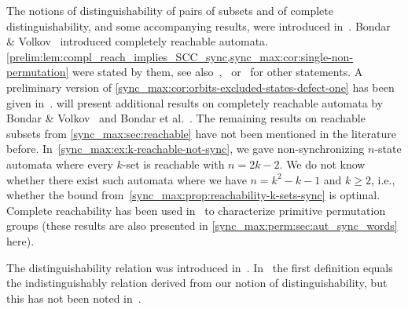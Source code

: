 
The notions of distinguishability of pairs of subsets and of complete distinguishability, and some accompanying results,
were introduced in~\cite{DBLP:conf/dlt/Hoffmann23}. 
Bondar \& Volkov~\cite{BondarV16,BondarCV23} introduced 
completely reachable automata.
\cref{prelim:lem:compl_reach_implies_SCC_sync,sync_max:cor:single-non-permutation}
were stated by them, 
see also~\cite[Sect.~6]{BondarCV23},~\cite{DBLP:conf/latin/CasasV22}
or~\cite[Prop.~3]{HoffmannCircularExtended}
for other statements.
A preliminary version of \cref{sync_max:cor:orbits-excluded-states-defect-one}
has been given in~\cite[Prop.~3]{DBLP:conf/lata/Hoffmann21a}.
 will present additional
results on completely reachable automata by Bondar \& Volkov~\cite{BondarV16,BondarV18}
and Bondar et al.~\cite{BondarCV23}.
The remaining results on reachable subsets from \cref{sync_max:sec:reachable} 
have not been mentioned in the literature before. 
In~\cref{sync_max:ex:k-reachable-not-sync}, we gave non-synchronizing $n$-state automata where every
$k$-set is reachable with $n = 2k - 2$. We do not know whether there exist such automata
where we have $n = k^2 - k - 1$ and $k \ge 2$, i.e., whether 
the bound from~\cref{sync_max:prop:reachability-k-sets-sync}
is optimal.
Complete reachability has been used in~\cite{HoffmannLATAextended2} to characterize primitive permutation groups (these results are also presented in \cref{sync_max:perm:sec:aut_sync_words} here).


The distinguishability relation was introduced in~\cite{DBLP:conf/dlt/Hoffmann23,Hoffmann2024}.
In~\cite[Def.~5]{DBLP:journals/jalc/FrigeriR25} the first definition equals the indistinguishably relation
derived from our notion of distinguishability, but this has not been noted in~\cite{DBLP:journals/jalc/FrigeriR25}.

